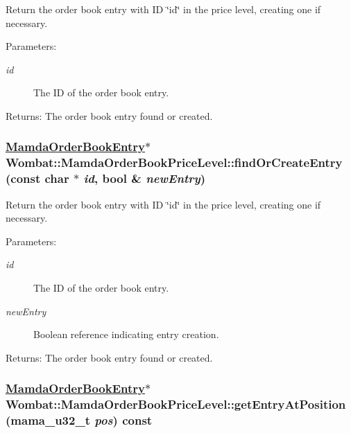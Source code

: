 Return the order book entry with ID \char`\"{}id\char`\"{} in the price level, creating one if necessary. 

\begin{Desc}
\item[Parameters:]
\begin{description}
\item[{\em id}]The ID of the order book entry. \end{description}
\end{Desc}
\begin{Desc}
\item[Returns:]The order book entry found or created. \end{Desc}
\hypertarget{classWombat_1_1MamdaOrderBookPriceLevel_b84ac5db71f02aa1064b15eaf4118891}{
\subsubsection[findOrCreateEntry]{\setlength{\rightskip}{0pt plus 5cm}\hyperlink{classWombat_1_1MamdaOrderBookEntry}{Mamda\-Order\-Book\-Entry}$\ast$ Wombat::Mamda\-Order\-Book\-Price\-Level::find\-Or\-Create\-Entry (const char $\ast$ {\em id}, bool \& {\em new\-Entry})}}
\label{classWombat_1_1MamdaOrderBookPriceLevel_b84ac5db71f02aa1064b15eaf4118891}


Return the order book entry with ID \char`\"{}id\char`\"{} in the price level, creating one if necessary. 

\begin{Desc}
\item[Parameters:]
\begin{description}
\item[{\em id}]The ID of the order book entry. \item[{\em new\-Entry}]Boolean reference indicating entry creation. \end{description}
\end{Desc}
\begin{Desc}
\item[Returns:]The order book entry found or created. \end{Desc}
\hypertarget{classWombat_1_1MamdaOrderBookPriceLevel_65d00d9d3759481b617d967d6d9ad808}{
\subsubsection[getEntryAtPosition]{\setlength{\rightskip}{0pt plus 5cm}\hyperlink{classWombat_1_1MamdaOrderBookEntry}{Mamda\-Order\-Book\-Entry}$\ast$ Wombat::Mamda\-Order\-Book\-Price\-Level::get\-Entry\-At\-Position (mama\_\-u32\_\-t {\em pos}) const}}
\label{classWombat_1_1MamdaOrderBookPriceLevel_65d00d9d3759481b617d967d6d9ad808}


